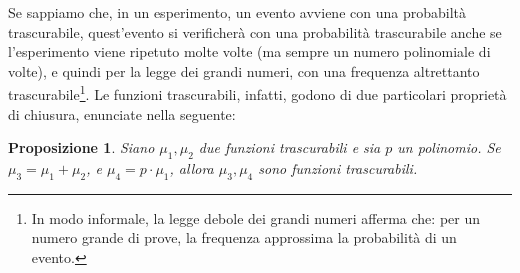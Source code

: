 \documentclass[a4paper,openright,twoside,12pt]{report}
\newtheorem{proposizione}{Proposizione}[chapter]
\begin{document}
Se sappiamo che, in un esperimento, un evento avviene con una probabilt\`a trascurabile,
quest'evento si verificher\`a con una probabilit\`a trascurabile anche se l'esperimento viene ripetuto molte volte (ma sempre un numero polinomiale di volte), e quindi per la legge dei grandi numeri, 
con una frequenza altrettanto trascurabile\footnote{In modo informale, la legge debole dei grandi numeri afferma che: per un numero grande di prove, 
la frequenza approssima la probabilit\`a di un evento.}. 
Le funzioni trascurabili, infatti, godono di due particolari propriet\`a di chiusura, enunciate nella seguente:
\begin{proposizione}
Siano $\mu_1, \mu_2$ due funzioni trascurabili e sia $p$ un polinomio. Se $\mu_3 = \mu_1 + \mu_2$, e $\mu_4= p\cdot \mu_1$, allora $\mu_3, \mu_4$ sono funzioni trascurabili.  
\end{proposizione} 
\end{document}
